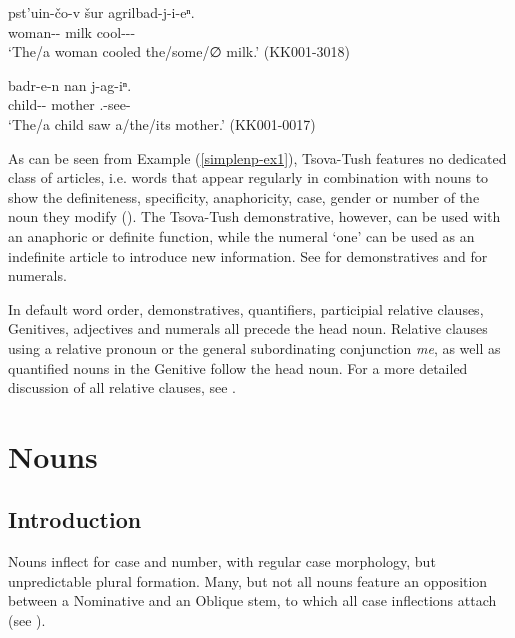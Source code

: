 \begin{exe}
	\ex\label{simplenp-ex1} \begin{xlist}
		

			\ex\label{simplenp-ex1a}
			\gll pst'uin-čo-v šur agrilbad-j-i-eⁿ. \\
			woman-{\Obl}-{\Erg} milk cool-{\J}-{\Tr}-{\Aor} \\
			\trans `The/a woman cooled the/some/∅ milk.'
			\hfill (KK001-3018)

		

			\ex\label{simplenp-ex1b}
			\gll badr-e-n nan j-ag-iⁿ.  \\
			child-{\Obl}-{\Dat} mother {\F}.{\Sg}-see-{\Aor} \\
			\trans `The/a child saw a/the/its mother.'
			\hfill (KK001-0017)

		
	\end{xlist}
\end{exe}

As can be seen from Example (\ref{simplenp-ex1}), Tsova-Tush features no dedicated class of articles, i.e. words that appear regularly in combination with nouns to show the definiteness, specificity, anaphoricity, case, gender or number of the noun they modify (\cite[152]{dryer07}).  The Tsova-Tush demonstrative, however, can be used with an anaphoric or definite function, while the numeral `one' can be used as an indefinite article to introduce new information. See  for demonstratives and  for numerals.



In default word order, demonstratives, quantifiers, participial relative clauses, Genitives, adjectives and numerals all precede the head noun. Relative clauses using a relative pronoun or the general subordinating conjunction \textit{me}, as well as quantified nouns in the Genitive follow the head noun. For a more detailed discussion of all relative clauses, see .

\section{Nouns} 
\subsection{Introduction} \label{nouns}

Nouns inflect for case and number, with regular case morphology, but unpredictable plural formation. Many, but not all nouns feature an opposition between a Nominative and an Oblique stem, to which all case inflections attach (see ). 

